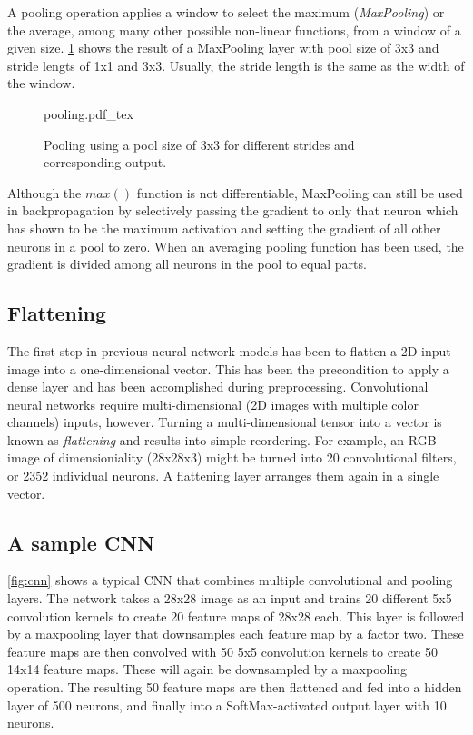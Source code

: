 A pooling operation applies a window to select the maximum (\textsl{MaxPooling}) or the average, among many other possible non-linear functions, from a window of a given size. \cref{fig:pooling} shows the result of a MaxPooling layer with pool size of 3x3 and stride lengts of 1x1 and 3x3. Usually, the stride length is the same as the width of the window.

\begin{figure}[htb]
    \centering
    \def\svgwidth{0.8\textwidth}
    {pooling.pdf_tex}
    \caption{Pooling using a pool size of 3x3 for different strides and corresponding output.\label{fig:pooling}}
\end{figure}

Although the $max()$ function is not differentiable, MaxPooling can still be used in backpropagation by selectively passing the gradient to only that neuron which has shown to be the maximum activation and setting the gradient of all other neurons in a pool to zero. When an averaging pooling function has been used, the gradient is divided among all neurons in the pool to equal parts.

\subsection{Flattening}

The first step in previous neural network models has been to flatten a 2D input image into a one-dimensional vector. This has been the precondition to apply a dense layer and has been accomplished during preprocessing. Convolutional neural networks require multi-dimensional (2D images with multiple color channels) inputs, however. Turning a multi-dimensional tensor into a vector is known as \textsl{flattening} and results into simple reordering. For example, an RGB image of dimensioniality (28x28x3) might be turned into 20 convolutional filters, or 2352 individual neurons. A flattening layer arranges them again in a single vector.

\subsection{A sample CNN}

\cref{fig:cnn} shows a typical CNN that combines multiple convolutional and pooling layers. The network takes a 28x28 image as an input and trains 20 different 5x5 convolution kernels to create 20 feature maps of 28x28 each. This layer is followed by a maxpooling layer that downsamples each feature map by a factor two. These feature maps are then convolved with 50 5x5 convolution kernels to create 50 14x14 feature maps. These will again be downsampled by a maxpooling operation. The resulting 50 feature maps are then flattened and fed into a hidden layer of 500 neurons, and finally into a SoftMax-activated output layer with 10 neurons.

